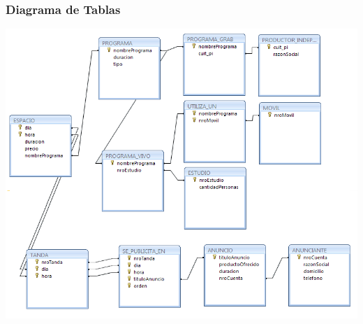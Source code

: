 \documentclass[a4paper,10pt,titlepage]{article}
\begin{document}
\subsubsection{Diagrama de Tablas}
\begin{center}
\includegraphics[width=18cm]{./tablas.png}    
\end{center}
\end{document}
